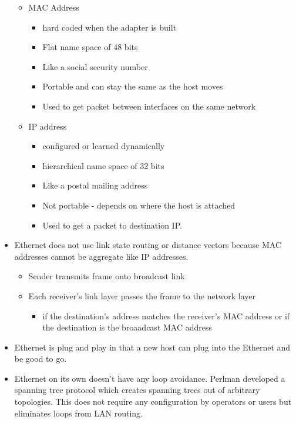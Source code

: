 \begin{itemize}
  \begin{itemize}
  \tightlist
  \item
    MAC Address

    \begin{itemize}
    \tightlist
    \item
      hard coded when the adapter is built
    \item
      Flat name space of 48 bits
    \item
      Like a social security number
    \item
      Portable and can stay the same as the host moves
    \item
      Used to get packet between interfaces on the same network
    \end{itemize}
  \item
    IP address

    \begin{itemize}
    \tightlist
    \item
      configured or learned dynamically
    \item
      hierarchical name space of 32 bits
    \item
      Like a postal mailing address
    \item
      Not portable - depends on where the host is attached
    \item
      Used to get a packet to destination IP.
    \end{itemize}
  \end{itemize}
\item
  Ethernet does not use link state routing or distance vectors because
  MAC addresses cannot be aggregate like IP addresses.

  \begin{itemize}
  \tightlist
  \item
    Sender transmits frame onto broadcast link
  \item
    Each receiver's link layer passes the frame to the network layer

    \begin{itemize}
    \tightlist
    \item
      if the destination's address matches the receiver's MAC address or
      if the destination is the broaadcast MAC address
    \end{itemize}
  \end{itemize}
\item
  Ethernet is plug and play in that a new host can plug into the
  Ethernet and be good to go.
\item
  Ethernet on its own doesn't have any loop avoidance. Perlman developed
  a spanning tree protocol which creates spanning trees out of arbitrary
  topologies. This does not require any configuration by operators or
  users but eliminates loops from LAN routing.


\end{itemize}
